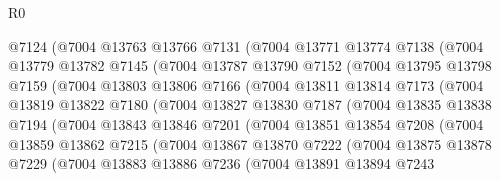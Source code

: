\begin{lexlean}{R0}
\begin{coremodule}
              @7124
              (@7004
                @13763
                @13766
                @7131
                (@7004
                  @13771
                  @13774
                  @7138
                  (@7004
                    @13779
                    @13782
                    @7145
                    (@7004
                      @13787
                      @13790
                      @7152
                      (@7004
                        @13795
                        @13798
                        @7159
                        (@7004
                          @13803
                          @13806
                          @7166
                          (@7004
                            @13811
                            @13814
                            @7173
                            (@7004
                              @13819
                              @13822
                              @7180
                              (@7004
                                @13827
                                @13830
                                @7187
                                (@7004
                                  @13835
                                  @13838
                                  @7194
                                  (@7004
                                    @13843
                                    @13846
                                    @7201
                                    (@7004
                                      @13851
                                      @13854
                                      @7208
                                      (@7004
                                        @13859
                                        @13862
                                        @7215
                                        (@7004
                                          @13867
                                          @13870
                                          @7222
                                          (@7004
                                            @13875
                                            @13878
                                            @7229
                                            (@7004
                                              @13883
                                              @13886
                                              @7236
                                              (@7004
                                                @13891
                                                @13894
                                                @7243

\end{coremodule}
\end{lexlean}
